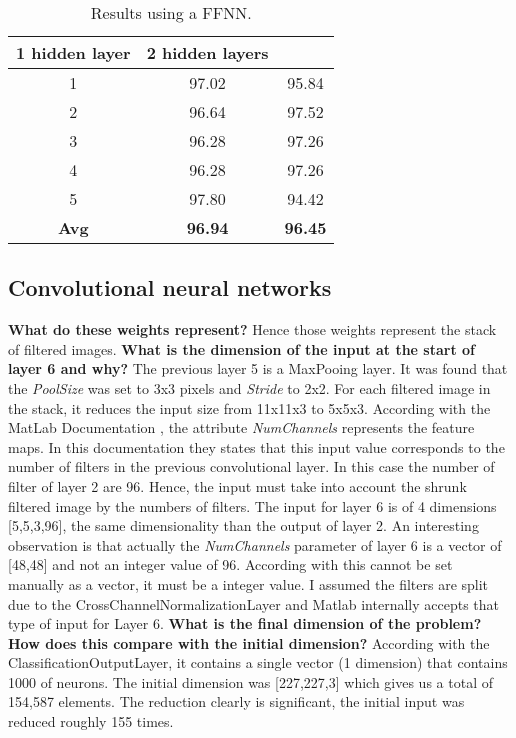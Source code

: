 \begin{table}[!htbp]
\centering
\caption{Results using a FFNN.}
\label{table_sec_4_3}
\medbreak
\begin{tabular}{c|c|c}
1 hidden layer & 2 hidden layers \\\hline
1 & 97.02 & 95.84 \\\hline
2 & 96.64 & 97.52 \\\hline
3 & 96.28 & 97.26  \\\hline
4 & 96.28 & 97.26 \\\hline
5 & 97.80 & 94.42 \\\hline
\textbf{Avg} & \textbf{96.94} & \textbf{96.45}
\end{tabular}
\end{table}


\subsection{Convolutional neural networks}
\textbf{What do these weights represent?}
\smallbreak
Hence those weights represent the stack of filtered images. 
\bigbreak
\textbf{What is the dimension of the input at the start of layer 6 and why?}
\smallbreak
The previous layer 5 is a MaxPooing layer. It was found that the \textit{PoolSize} was set to 3x3 pixels and \textit{Stride} to 2x2. For each filtered image in the stack, it reduces the input size from 11x11x3 to 5x5x3. According with the MatLab Documentation \cite{matlab_1}, the attribute \textit{NumChannels} represents the feature maps. In this documentation they states that this input value corresponds to the number of filters in the previous convolutional layer. In this case the number of filter of layer 2 are 96. Hence, the input must take into account the shrunk filtered image by the numbers of filters. The input for layer 6 is of 4 dimensions [5,5,3,96], the same dimensionality than the output of layer 2. An interesting observation is that actually the \textit{NumChannels}  parameter of layer 6 is a vector of [48,48] and not an integer value of 96. According with \cite{matlab_1} this cannot be set manually as a vector, it must be a integer value. I assumed the filters are split due to the CrossChannelNormalizationLayer and Matlab internally accepts that type of input for Layer 6.
\bigbreak
\textbf{What is the final dimension of the problem? How does this compare with the initial dimension?}
\smallbreak
According with the ClassificationOutputLayer, it contains a single vector (1 dimension) that contains 1000 of neurons. The initial dimension was [227,227,3] which gives us a total of 154,587 elements. The reduction clearly is significant, the initial input was reduced roughly 155 times.



